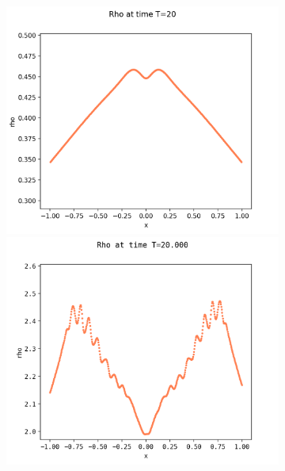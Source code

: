 \documentclass{article}
\numberwithin{equation}{section}
\newcommand{\imh}{\textheight} %
\newcommand{\imw}{\textwidth} %
\begin{document}
\begin{figure}
	\begin{subfigure}{\textwidth}
		\centering
		\includegraphics[height=\imh,width=\imw]{images/rhoT20_FD.png}
		\includegraphics[height=\imh,width=\imw]{images/rhoT20_512.png}

\end{subfigure}
\end{figure}
\end{document}

